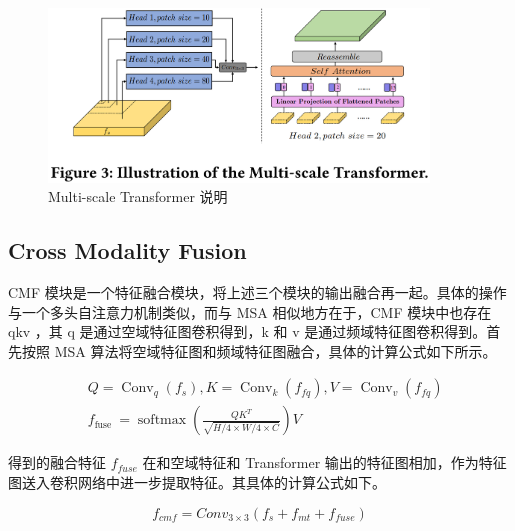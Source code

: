 \begin{figure}[htb]
\centering 
\includegraphics[width=0.90\textwidth]{img/ch4m13.png} 
\caption{Multi-scale Transformer 说明}
\label{Test}
\end{figure}

\subsection{Cross Modality Fusion}

CMF 模块是一个特征融合模块，将上述三个模块的输出融合再一起。具体的操作与一个多头自注意力机制类似，而与 MSA 相似地方在于，CMF 模块中也存在 qkv ，其 q 是通过空域特征图卷积得到，k 和 v 是通过频域特征图卷积得到。首先按照 MSA 算法将空域特征图和频域特征图融合，具体的计算公式如下所示。

$$
\begin{aligned}
&Q=\operatorname{Conv}_{q}\left(f_{s}\right), K=\operatorname{Conv}_{k}\left(f_{f q}\right), V=\operatorname{Conv}_{v}\left(f_{f q}\right) \\
&f_{\text {fuse }}=\operatorname{softmax}\left(\frac{Q K^{T}}{\sqrt{H / 4 \times W / 4 \times C}}\right) V
\end{aligned}
$$

得到的融合特征 $f_{fuse}$ 在和空域特征和 Transformer 输出的特征图相加，作为特征图送入卷积网络中进一步提取特征。其具体的计算公式如下。

$$
f_{c m f}=C o n v_{3 \times 3}\left(f_{s}+f_{m t}+f_{f u s e}\right)
$$

